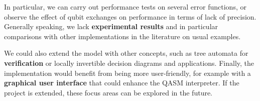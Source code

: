 In particular, we can carry out performance tests on several error functions, or observe the effect of qubit exchanges on performance in terms of lack of precision. Generally speaking, we lack \textbf{experimental results} and in particular comparisons with other implementations in the literature on usual examples.

We could also extend the model with other concepts, such as tree automata for \textbf{verification} or locally invertible decision diagrams and applications. \cite{Chen_2023} \cite{Vinkhuijzen_2023} Finally, the implementation would benefit from being more user-friendly, for example with a \textbf{graphical user interface} that could enhance the QASM interpreter. If the project is extended, these focus areas can be explored in the future.
